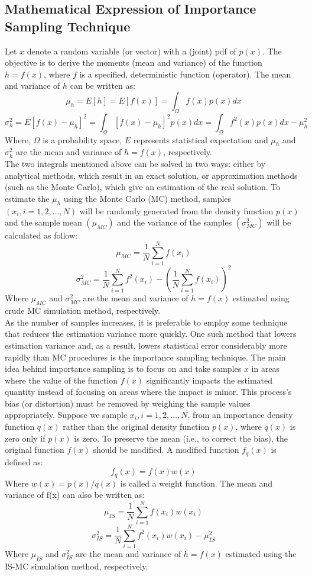     \subsection{Mathematical Expression of Importance Sampling Technique}
        Let $x$ denote a random variable (or vector) with a (joint) pdf of $p(x)$. The objective is to derive the moments (mean and variance) of the function $h=f(x)$, where $f$ is a specified, deterministic function (operator). 
        The mean and variance of $h$ can be written as:
        $$\mu_h=E[h]=E[f(x)]=\int_\Omega f(x)p(x)dx$$
        $$\sigma_h^2=E{[f(x)-\mu_h]^2}=\int_\Omega[f(x)-\mu_h]^2 p(x)dx = \int_\Omega f^2(x)p(x)dx-\mu^2_h$$
        Where, $\Omega$ is a probability space, $E$ represents statistical expectation and $\mu_h$ and $\sigma_h^2$ are the mean and variance of $h=f(x)$, respectively. \\ 
        The two integrals mentioned above can be solved in two ways: either by analytical methods, which result in an exact solution, or approximation methods (such as the Monte Carlo), which give an estimation of the real solution. 
        To estimate the $\mu_h$ using the Monte Carlo (MC) method, samples $(x_i, i=1,2,…,N)$ will be randomly generated from the density function $p(x)$ and the sample mean $(\mu_{MC})$ and the variance of the samples $(\sigma_{MC}^2)$ will be calculated as follow:
        $$\mu_{MC}=\frac{1}{N}\sum_{i=1}^{N} f(x_i)$$
        $$\sigma_{MC}^2=\frac{1}{N}\sum_{i=1}^{N}f^2(x_i)-(\frac{1}{N}\sum_{i=1}^{N} f(x_i))^2$$
        Where $\mu_{MC}$ and $\sigma_{MC}^2$ are the mean and variance of $h=f(x)$ estimated using crude MC simulation method, respectively.\\ 
        As the number of samples increases, it is preferable to employ some technique that reduces the estimation variance more quickly. One such method that lowers estimation variance and, as a result, lowers statistical error considerably more rapidly than MC procedures is the importance sampling technique.
        The main idea behind importance sampling is to focus on and take samples $x$ in areas where the value of the function $f(x)$ significantly impacts the estimated quantity instead of focusing on areas where the impact is minor. This process's bias (or distortion) must be removed by weighing the sample values appropriately.
        Suppose we sample $x_i  ,i=1,2,…,N$, from an importance density function $q(x)$ rather than the original density function $p(x)$, where $q(x)$ is zero only if $p(x)$ is zero. To preserve the mean (i.e., to correct the bias), the original function $f(x)$ should be modified. A modified function $f_q(x)$ is defined as:
        $$f_q(x)=f(x) w(x)$$
        Where $w(x)=p(x)/q(x)$ is called a weight function. 
        The mean and variance of f(x) can also be written as:
        $$\mu_{IS}=\frac{1}{N} \sum_{i=1}^{N}f(x_i)w(x_i)$$
        $$\sigma_{IS}^2=\frac{1}{N} \sum_{i=1}^N f^2(x_i)w(x_i)-\mu_{IS}^2$$
        Where $\mu_{IS}$ and $\sigma_{IS}^2$ are the mean and variance of $h=f(x)$ estimated using the IS-MC simulation method, respectively. 
        
